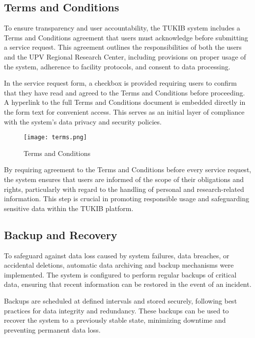 \subsection{Terms and Conditions}

To ensure transparency and user accountability, the TUKIB system includes a Terms and Conditions agreement that users must acknowledge before submitting a service request. This agreement outlines the responsibilities of both the users and the UPV Regional Research Center, including provisions on proper usage of the system, adherence to facility protocols, and consent to data processing.

In the service request form, a checkbox is provided requiring users to confirm that they have read and agreed to the Terms and Conditions before proceeding. A hyperlink to the full Terms and Conditions document is embedded directly in the form text for convenient access. This serves as an initial layer of compliance with the system’s data privacy and security policies.

\begin{figure}[h]
	\centering
	\texttt{[image: terms.png]}
	\caption{Terms and Conditions}
	\label{fig:terms}
\end{figure}

By requiring agreement to the Terms and Conditions before every service request, the system ensures that users are informed of the scope of their obligations and rights, particularly with regard to the handling of personal and research-related information. This step is crucial in promoting responsible usage and safeguarding sensitive data within the TUKIB platform.

\subsection{Backup and Recovery}

To safeguard against data loss caused by system failures, data breaches, or accidental deletions, automatic data archiving and backup mechanisms were implemented. The system is configured to perform regular backups of critical data, ensuring that recent information can be restored in the event of an incident.

Backups are scheduled at defined intervals and stored securely, following best practices for data integrity and redundancy. These backups can be used to recover the system to a previously stable state, minimizing downtime and preventing permanent data loss. 

